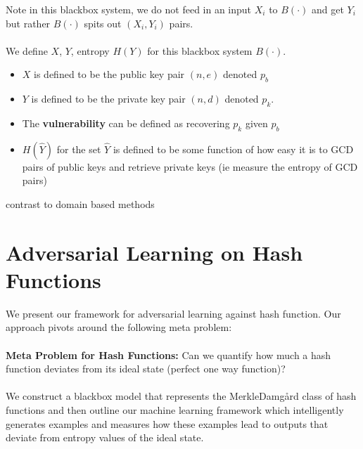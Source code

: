 \documentclass[letterpaper,twocolumn,10pt]{article}
\begin{document}
Note in this blackbox system, we do not feed in an input $X_{i}$ to $B(\cdot)$ and get $Y_{i}$ but rather $B(\cdot)$ spits out $(X_{i}, Y_{i})$ pairs. 
\\
\\
We define $X$, $Y$, entropy $H(Y)$ for this blackbox system $B(\cdot)$.
\begin{itemize}
\item $X$ is defined to be the public key pair $(n, e)$ denoted $p_{b}$
\item $Y$ is defined to be the private key pair $(n, d)$ denoted $p_{k}$.
\item The \textbf{vulnerability} can be defined as recovering $p_{k}$ given $p_{b}$
\item $H(\hat{Y})$ for the set $\hat{Y}$ is defined to be some function of how easy it is to GCD pairs of public keys and retrieve private keys (ie measure the entropy of GCD pairs)
\end{itemize}

contrast to domain based methods 
\section{Adversarial Learning on Hash Functions}
We present our framework for adversarial learning against hash function. Our approach pivots around the following meta problem:
\\
\\
\textbf{Meta Problem for Hash Functions:} Can we quantify how much a hash function deviates from its ideal state (perfect one way function)?
\\
\\
We construct a blackbox model that represents the Merkle{\textendash}Damg\r{a}rd class of hash functions and then outline our machine learning framework which intelligently generates examples and measures how these examples lead to outputs that deviate from entropy values of the ideal state.
\end{document}
